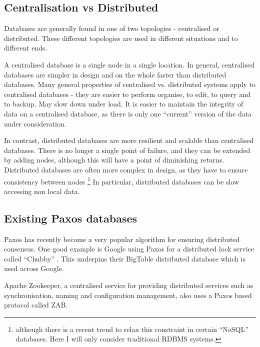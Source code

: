 \documentclass[12pt,twoside,notitlepage]{report}
\begin{document}
\subsection*{Centralisation vs Distributed}

Databases are generally found in one of two topologies - centralised or distributed. These
different topologies are used in different situations and to different ends.

A centralised database is a single node in a single location.
In general, centralised databases are simpler in design and on the whole faster than distributed
databases.
Many general properties of centralised vs. distributed systems apply to centralised databases -
they are easier to perform organise, to edit, to query and to backup. May slow down under load. It
is easier to maintain the integrity of data on a centralised database, as there is only one
``current'' version of the data under consideration.

In contrast, distributed databases are more resilient and scalable than centralised databases.
There is no longer a single point of failure, and they can be extended by adding nodes, although
this will have a point of diminishing returns. Distributed databases are often more complex in
design, as they have to ensure consistency between nodes \footnote{although there is a recent trend to
relax this constraint in certain ``NoSQL'' databases. Here I will only consider traditional RDBMS
systems.} In particular, distributed databases can be slow accessing non local data.


\subsection*{Existing Paxos databases}

Paxos has recently become a very popular algorithm for ensuring distributed
consensus. One good example is Google using Paxos for a distributed lock
service called ``Chubby'' \cite{chandra07}. This underpins their BigTable
distributed database which is used across Google.

Apache Zookeeper, a centralised service for providing distributed services such
as synchronisation, naming and configuration management, also uses a Paxos
based protocol called ZAB.

\end{document}
